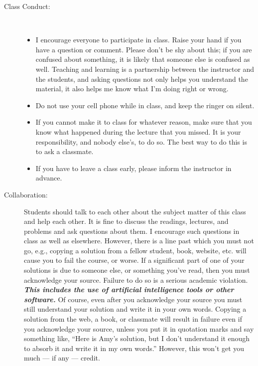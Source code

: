 \documentclass [letterpaper,11pt]{article}
\begin{document}
\begin{description}
\item[Class Conduct:] \
   \begin{itemize}\setlength{\itemsep}{0em}\setlength{\parskip}{0pt}
   	\item I encourage everyone to participate in class. Raise your hand if you have a question or
comment. Please don't be shy about this; if you are confused about something, it is likely
that someone else is confused as well. Teaching and learning is a partnership between
the instructor and the students, and asking questions not only helps you understand the
material, it also helps me know what I'm doing right or wrong.
	\item Do not use your cell phone while in class, and keep the ringer on silent.
	
	\item  If you cannot make it to class for whatever reason, make sure that you know what
happened during the lecture that you missed. It is your responsibility, and nobody
else's, to do so. The best way to do this is to ask a classmate. 
	\item If you have to leave a class early, please inform the instructor in advance. 	     
     \end{itemize}


\item[Collaboration:]
Students should talk to each other about the subject matter of this class and help each other.  It is fine to discuss the readings, lectures, and problems and ask questions about them. I encourage such questions in class as well as elsewhere. However, there is a line past which you must not go, e.g., copying a solution from a fellow student, book, website, etc. will cause you to fail the course, or worse. If a significant part of one of your solutions is due to someone else, or something you've read, then you must acknowledge your source. Failure to do so is a serious academic violation.  \emph{\textbf{ This includes the use of artificial
intelligence tools or other software.}} Of course, even after you acknowledge your source you must still understand your solution and write it in your own words. Copying a solution from the web, a book, or classmate will result in failure even if you acknowledge your source, unless you put it in quotation marks and say something like, ``Here is Amy's solution, but I don't understand it enough to absorb it and write it in my own words.'' However, this won't get you much --- if any --- credit. 



\end{description}
\end{document}
